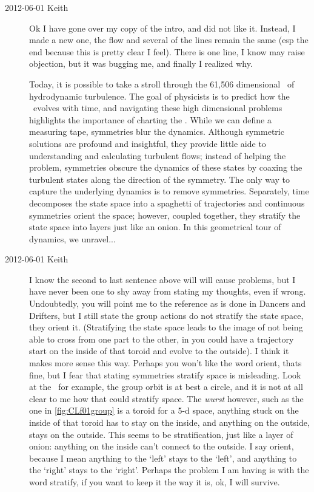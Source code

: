 \begin{description}
\item[2012-06-01 Keith] Ok I have gone over my copy of the intro, and did
not like it.  Instead, I made a new one, the flow and several of the
lines remain the same (esp the end because this is pretty clear I feel).
There is one line, I know may raise objection, but it was bugging me, and
finally I realized why.

    Today, it is possible to take a stroll through the 61,506 dimensional
    \statesp\ of hydrodynamic turbulence.  The goal of physicists is to
    predict how the \statesp\ evolves with time, and navigating these
    high dimensional problems highlights the importance of charting the
    \statesp.  While we can define a measuring tape, symmetries blur the
    dynamics.  Although symmetric solutions are profound and insightful,
    they provide little aide to understanding and calculating turbulent
    flows; instead of helping the problem, symmetries obscure the
    dynamics of these states by coaxing the turbulent states along the
    direction of the symmetry.  The only way to capture the underlying
    dynamics is to remove symmetries.  Separately, time decomposes the
    state space into a spaghetti of trajectories and continuous symmetries
    orient the space; however, coupled together, they stratify the state
    space into layers just like an onion.  In this geometrical tour of
    dynamics, we unravel...

\item[2012-06-01 Keith] I know the second to last sentence above will
will cause problems, but I have never been one to shy away from stating
my thoughts, even if wrong.  Undoubtedly, you will point me to the
reference as is done in Dancers and Drifters, but I still
state the group actions do not stratify the state space, they orient it.
(Stratifying the state space leads to the image of not being able to
cross from one part to the other, in  you could have a
trajectory start on the inside of that toroid and evolve to the outside).
I think it makes more sense this way.  Perhaps you won't like the word
orient, thats fine, but I fear that stating symmetries stratify space is
misleading.  Look at the \cLf\ for example, the group orbit is at best a
circle, and it is not at all clear to me how that could stratify space.
The \emph{wurst} however, such as the one in \ref{fig:CLf01group} is a
toroid for a 5-d space, anything stuck on the inside of that toroid has
to stay on the inside, and anything on the outside, stays on the outside.
This seems to be stratification, just like a layer of onion: anything on
the inside can't connect to the outside.  I say orient, because I mean
anything to the `left' stays to the `left', and anything to the
`right' stays to the `right'.  Perhaps the problem I am having is
with the word stratify, if you want to keep it the way it is, ok, I will
survive.


\end{description}
